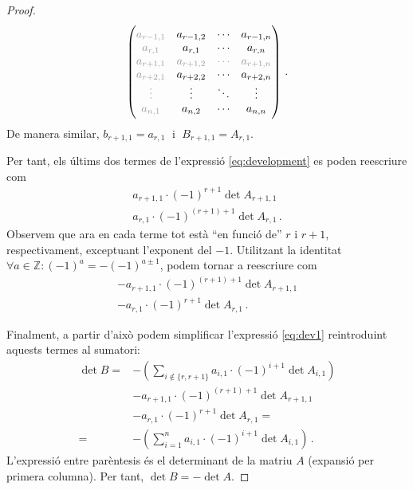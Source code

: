 \begin{lema}
\begin{proof}
\begin{alignat*}{2}
\begin{pmatrix}
		\color[gray]{0.6}
		a_{r-1,1} &	a_{r-1,2} &	\cdots &	a_{r-1,n} \\
		\color[gray]{0.6}
		a_{r,1} &	a_{r,1} &	\cdots &	a_{r,n} \\
		\color[gray]{0.6}	a_{r+1,1} &	\color[gray]{0.6}a_{r+1,2} &\color[gray]{0.6}	\cdots &	\color[gray]{0.6}a_{r+1,n}  \\
		\color[gray]{0.6}
		a_{r+2,1} &	a_{r+2,2} &	\cdots &	a_{r+2,n} \\
		\color[gray]{0.6}
		\vdots &	\vdots &	\ddots &	\vdots \\
		\color[gray]{0.6}
		a_{n,1} &	a_{n,2} &	\cdots &	a_{n,n} \\
		\end{pmatrix}\,.
		\end{alignat*}
		De manera similar, $b_{r+1, 1} = a_{r, 1}\;$ i $\;B_{r+1,1} = A_{r,1}$.
		
		Per tant, els últims dos termes de l'expressió \eqref{eq:development} es poden reescriure com
		\begin{equation*}\label{eq:penult}
		\begin{gathered}
		a_{r+1,1}\cdot(-1)^{r+1}\det A_{r+1,1}\\
		a_{r,1}\cdot(-1)^{(r+1)+1}\det A_{r,1}\,.
		\end{gathered}
		\end{equation*}
		Observem que ara en cada terme tot està ``en funció de'' $r$ i $r+1$, respectivament, exceptuant l'exponent del $-1$. Utilitzant la identitat $\forall a\in\mathbb{Z} : (-1)^a = -(-1)^{a\pm 1}$, podem tornar a reescriure com
		\begin{equation*}\label{eq:last}
		\begin{gathered}
		-a_{r+1,1}\cdot(-1)^{(r+1)+1}\det A_{r+1,1}\\
		-a_{r,1}\cdot(-1)^{r+1}\det A_{r,1}\,.
		\end{gathered}
		\end{equation*}
		
		Finalment, a partir d'això podem simplificar l'expressió \eqref{eq:dev1} reintroduint aquests termes al sumatori:
		\begin{equation}\label{eq:development}
		\begin{split}
		\det B =& 	-\left(\sum_{i\notin \{r, r+1\}} a_{i,1}\cdot(-1)^{i+1}\det A_{i,1}\right)\\
		&	-a_{r+1,1}\cdot(-1)^{(r+1)+1}\det A_{r+1,1}\\
		&	-a_{r,1}\cdot(-1)^{r+1}\det A_{r,1} = \\
		=&-\left(\sum_{i=1}^{n} a_{i,1}\cdot(-1)^{i+1}\det A_{i,1}\right)\,.
		\end{split}
		\end{equation}
		L'expressió entre parèntesis és el determinant de la matriu $A$ (expansió per primera columna). Per tant, $\det B = -\det A$.
	\end{proof}


\end{lema}

